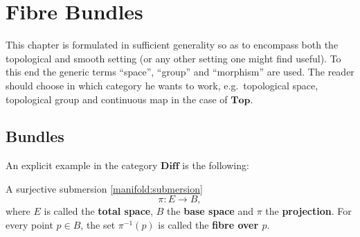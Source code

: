 \chapter{Fibre Bundles}\label{chapter:bundles}

    This chapter is formulated in sufficient generality so as to encompass both the topological and smooth setting (or any other setting one might find useful). To this end the generic terms ``space'', ``group'' and ``morphism'' are used. The reader should choose in which category he wants to work, e.g.~topological space, topological group and continuous map in the case of $\mathbf{Top}$.

\section{Bundles}


    An explicit example in the category $\mathbf{Diff}$ is the following:
    \begin{example}
        A surjective submersion \ref{manifold:submersion} \[\pi:E\rightarrow B,\] where $E$ is called the \textbf{total space}, $B$ the \textbf{base space} and $\pi$ the \textbf{projection}. For every point $p\in B$, the set $\pi^{-1}(p)$ is called the \textbf{fibre over $p$}.
    \end{example}

